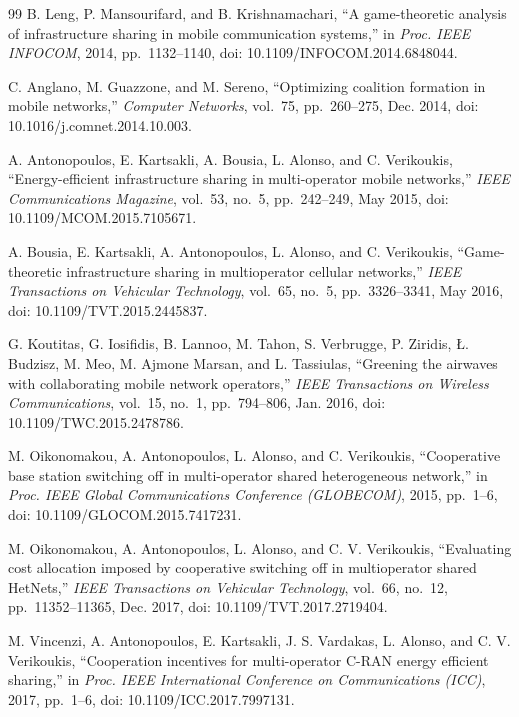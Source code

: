 \documentclass{article}
\theoremstyle{definition}
\theoremstyle{remark}
\theoremstyle{remark}
\theoremstyle{plain}
\theoremstyle{definition}
\theoremstyle{definition}
\theoremstyle{definition}
\begin{document}
\begin{thebibliography}{99}
B. Leng, P. Mansourifard, and B. Krishnamachari,
``A game-theoretic analysis of infrastructure sharing in mobile communication
systems,'' in \textit{Proc. IEEE INFOCOM}, 2014, pp.~1132--1140,
doi: 10.1109/INFOCOM.2014.6848044.

C. Anglano, M. Guazzone, and M. Sereno,
``Optimizing coalition formation in mobile networks,''
\textit{Computer Networks}, vol.~75, pp.~260--275, Dec. 2014,
doi: 10.1016/j.comnet.2014.10.003.

A. Antonopoulos, E. Kartsakli, A. Bousia, L. Alonso, and C. Verikoukis,
``Energy-efficient infrastructure sharing in multi-operator mobile networks,''
\textit{IEEE Communications Magazine}, vol.~53, no.~5, pp.~242--249,
May 2015, doi: 10.1109/MCOM.2015.7105671.

A. Bousia, E. Kartsakli, A. Antonopoulos, L. Alonso, and C. Verikoukis,
``Game-theoretic infrastructure sharing in multioperator cellular networks,''
\textit{IEEE Transactions on Vehicular Technology}, vol.~65, no.~5,
pp.~3326--3341, May 2016, doi: 10.1109/TVT.2015.2445837.

G. Koutitas, G. Iosifidis, B. Lannoo, M. Tahon, S. Verbrugge, P. Ziridis,
{\L}. Budzisz, M. Meo, M. Ajmone Marsan, and L. Tassiulas,
``Greening the airwaves with collaborating mobile network operators,''
\textit{IEEE Transactions on Wireless Communications}, vol.~15, no.~1,
pp.~794--806, Jan. 2016, doi: 10.1109/TWC.2015.2478786.

M. Oikonomakou, A. Antonopoulos, L. Alonso, and C. Verikoukis,
``Cooperative base station switching off in multi-operator shared
heterogeneous network,'' in \textit{Proc. IEEE Global Communications
Conference (GLOBECOM)}, 2015, pp.~1--6,
doi: 10.1109/GLOCOM.2015.7417231.

M. Oikonomakou, A. Antonopoulos, L. Alonso, and C. V. Verikoukis,
``Evaluating cost allocation imposed by cooperative switching off in
multioperator shared HetNets,'' \textit{IEEE Transactions on Vehicular
Technology}, vol.~66, no.~12, pp.~11352--11365, Dec. 2017,
doi: 10.1109/TVT.2017.2719404.

M. Vincenzi, A. Antonopoulos, E. Kartsakli, J. S. Vardakas, L. Alonso,
and C. V. Verikoukis,
``Cooperation incentives for multi-operator C-RAN energy efficient sharing,''
in \textit{Proc. IEEE International Conference on Communications (ICC)},
2017, pp.~1--6, doi: 10.1109/ICC.2017.7997131.


\end{thebibliography}
\end{document}
